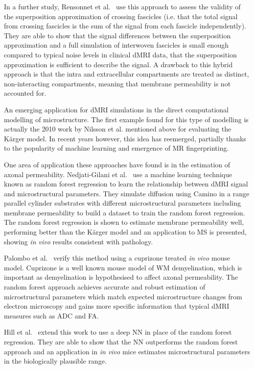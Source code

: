 In a further study, Rensonnet et al.\ \cite{Rensonnet2017} use this approach to assess the validity of the superposition approximation of crossing fascicles (i.e. that the total signal from crossing fascicles is the sum of the signal from each fascicle independently).
They are able to show that the signal differences between the superposition approximation and a full simulation of interwoven fascicles is small enough compared to typical noise levels in clinical \ac{dMRI} data, that the superposition approximation is sufficient to describe the signal.
A drawback to this hybrid approach is that the intra and extracellular compartments are treated as distinct, non-interacting compartments, meaning that membrane permeability is not accounted for.

An emerging application for \ac{dMRI} simulations in the direct computational modelling of microstructure.
The first example found for this type of modelling is actually the 2010 work by Nilsson et al. \cite{Nilsson2010} mentioned above for evaluating the K\"arger model.
In recent years however, this idea has reemerged, partially thanks to the popularity of machine learning and emergence of MR fingerprinting.

One area of application these approaches have found is in the estimation of axonal permeability. Nedjati-Gilani et al.\ \cite{Nedjati-Gilani2017} use a machine learning technique known as random forest regression to learn the relationship between \ac{dMRI} signal and microstructural parameters. They simulate diffusion using Camino in a range parallel cylinder substrates with different microstructural parameters including membrane permeability to build a dataset to train the random forest regression.
The random forest regression is shown to estimate membrane permeability well, performing better than the K\"arger model and an application to \ac{MS} is presented, showing \emph{in vivo} results consistent with pathology.

Palombo et al.\ \cite{Palombo2018a} verify this method using a cuprizone treated \emph{in vivo} mouse model. Cuprizone is a well known mouse model of \ac{WM} demyelination, which is important as demyelination is hypothesised to affect axonal permeability.
The random forest approach achieves accurate and robust estimation of microstructural parameters which match expected microstructure changes from electron microscopy and gains more specific information that typical \ac{dMRI} measures such as \ac{ADC} and \ac{FA}. 

Hill et al.\ \cite{Hill2018} extend this work to use a deep \ac{NN} in place of the random forest regression. They are able to show that the \ac{NN} outperforms the random forest approach and an application in \emph{in vivo} mice estimates microstructural parameters in the biologically plausible range.

